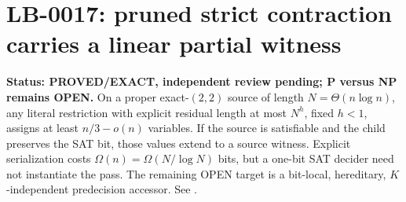 \section{LB-0017: pruned strict contraction carries a linear partial witness}
\textbf{Status: PROVED/EXACT, independent review pending; P versus NP remains OPEN.}
On a proper exact-$(2,2)$ source of length $N=\Theta(n\log n)$, any literal
restriction with explicit residual length at most $N^h$, fixed $h<1$, assigns
at least $n/3-o(n)$ variables.  If the source is satisfiable and the child
preserves the SAT bit, those values extend to a source witness.  Explicit
serialization costs $\Omega(n)=\Omega(N/\log N)$ bits, but a one-bit SAT
decider need not instantiate the pass.  The remaining OPEN target is a
bit-local, hereditary, $K$-independent predecision accessor.
See .
